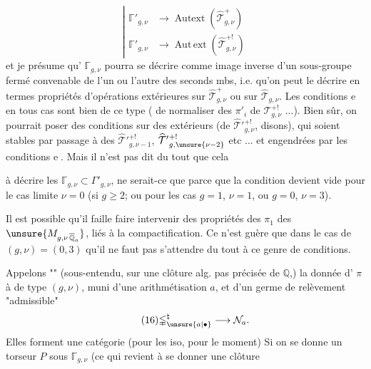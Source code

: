 
\[
\tag{15}
\left|
\begin{aligned}
\mathbb{\Gamma}'_{g,\nu}&\longrightarrow\operatorname{Autext}(\widehat{\mathcal T}_{g,\nu}^{+})\\
\mathbb{\Gamma}'_{g,\nu}&\longrightarrow\operatorname{Aut\,ext}(\widehat{\mathcal T}_{g,\nu}^{+!})
\end{aligned}
\right.
\]
et je présume qu' $\mathbb{\Gamma}_{g,\nu}$ pourra
se décrire comme image inverse d'un
sous-groupe fermé convenable de l'un
ou l'autre des seconds mbs, i.e. qu'on
peut le décrire en termes  propriétés
d'opérations extérieures sur $\widehat{\mathcal T}_{g,\nu}^{+}$ ou
sur $\widehat{\mathcal T}_{g,\nu}$. Les conditions \textcircled{e} en tous
cas sont bien de ce type (
de normaliser des  
 $\pi'_i$ de $\mathcal T_{g,\nu}^{+!}$ ...).
Bien sûr, on
pourrait poser des conditions sur des
 extérieurs (de $\widehat{\mathcal T}'{}_{g,\nu}^{+!}$, disons),
qui soient stables par passage  à des
$\widehat{\mathcal T}'{}_{g,\nu-1}^{+!}$, $\widehat{\mathcal T}'{}_{g,\unsure{\nu-2}}^{+!}$ etc ... et
engendrées par les conditions \textcircled{e}. Mais
il n'est pas dit du tout que cela


 à décrire les 
$\mathbb{\Gamma}_{g,\nu}\subset\Gamma'_{g,\nu}$,
ne serait-ce que parce que la condition
devient vide pour  le cas limite $\nu=0$
(si $g\geq2$; ou pour les cas $g=1$, $\nu=1$, ou $g=0$, $\nu=3$).

Il est possible qu'il faille faire
intervenir des propriétés des $\pi_1$ des
$\unsure{M_{g,\nu\,\overline{\mathbb Q}_a}}$, liés à la compactification.
Ce n'est guère que dans le cas de
$(g,\nu)=(0,3)$ qu'il ne faut pas s'attendre
du tout à ce genre de conditions.

Appelons ""
(sous-entendu, sur une clôture alg. pas précisée de $\mathbb Q$,)
la donnée d' 
$\pi$ à  
de type $(g,\nu)$, muni d'une arithmétisation
$a$, et d'un germe de relèvement
"admissible"
\[
\tag{16}
\mathbb{\Gamma}_{\unsure{a|\bullet}}^{\natural}
\longrightarrow\mathcal N_a.
\]
Elles forment une catégorie (pour les
iso, pour le moment) Si on se
donne un torseur $P$ sous $\mathbb{\Gamma}_{g,\nu}$
(ce qui  revient à se donner une clôture

